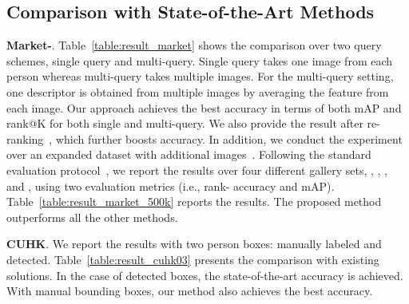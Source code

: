 \documentclass{llncs}
\begin{document}
\subsection{Comparison with State-of-the-Art Methods}

\noindent\textbf{Market-}.
Table~\ref{table:result_market} shows the comparison over two query schemes, single query and multi-query. Single query takes one image from each person whereas multi-query takes multiple images. For the multi-query setting, one descriptor is obtained from multiple images by averaging the feature from each image. Our approach achieves the best accuracy in terms of both mAP and rank@K for both single and multi-query.
We also provide the result after re-ranking~\cite{conf/cvpr/zhong17}, which further boosts accuracy.  In addition, we conduct the experiment over an expanded dataset with additional  images~\cite{conf/iccv/zheng15}. Following the standard evaluation protocol~\cite{journal/arxiv/hermans17}, we report the results over four different gallery sets, 
,
,
,
and ,
using two evaluation metrics (i.e., rank- accuracy and mAP). Table~\ref{table:result_market_500k} reports the results. The proposed method outperforms all the other methods.

\vspace{.1cm}
\noindent\textbf{CUHK}.
We report the results
with two person boxes:
manually labeled
and detected.
Table~\ref{table:result_cuhk03} presents the comparison with existing solutions.
In the case of detected boxes, the state-of-the-art accuracy is achieved. With manual bounding boxes, our method also achieves the best accuracy.
\end{document}
